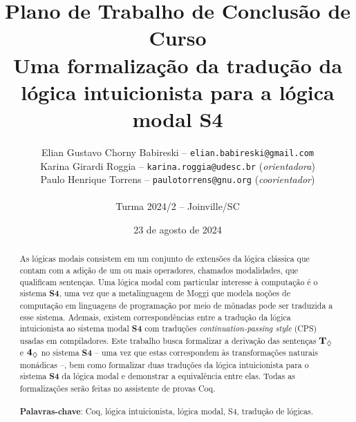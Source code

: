 \title{
Plano de Trabalho de Conclusão de Curso\\
Uma formalização da tradução da lógica intuicionista para a lógica modal S4
}

\author{
Elian Gustavo Chorny Babireski -- \texttt{elian.babireski@gmail.com}\\
Karina Girardi Roggia -- \texttt{karina.roggia@udesc.br} {(\textit{orientadora})}\\
Paulo Henrique Torrens -- \texttt{paulotorrens@gnu.org} {(\textit{coorientador})}\\
~\\
Turma 2024/2 -- Joinville/SC
}

\date{23 de agosto de 2024}

\maketitle

\onehalfspacing  %

\begin{abstract}
As lógicas modais consistem em um conjunto de extensões da lógica clássica que contam com a adição de um ou mais operadores, chamados modalidades, que qualificam sentenças. Uma lógica modal com particular interesse à computação é o sistema \textbf{S4}, uma vez que a metalinguagem de Moggi que modela noções de computação em linguagens de programação por meio de mônadas pode ser traduzida a esse sistema. Ademais, existem correspondências entre a tradução da lógica intuicionista ao sistema modal \textbf{S4} com traduções \textit{continuation-passing style} (CPS) usadas em compiladores. Este trabalho busca formalizar a derivação das sentenças $\boldsymbol{\text{\textbf{T}}_\Diamond}$ e $\boldsymbol{\text{\textbf{4}}_\Diamond}$ no sistema \textbf{S4} -- uma vez que estas correspondem às transformações naturais monádicas --, bem como formalizar duas traduções da lógica intuicionista para o sistema \textbf{S4} da lógica modal e demonstrar a equivalência entre elas. Todas as formalizações serão feitas no assistente de provas Coq. \\\\
\textbf{Palavras-chave}: Coq, lógica intuicionista, lógica modal, S4, tradução de lógicas.
\end{abstract}